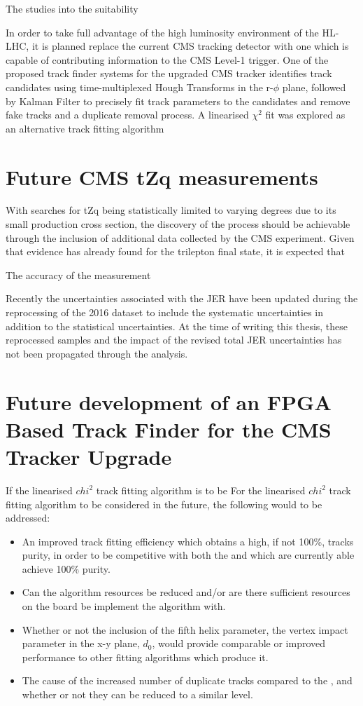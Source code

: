 The studies into the suitability 

In order to take full advantage of the high luminosity environment of the HL-LHC, it is planned replace the current CMS tracking detector with one which is capable of contributing information to the CMS Level-1 trigger.
One of the proposed track finder systems for the upgraded CMS tracker identifies track candidates using time-multiplexed Hough Transforms in the r-$\phi$ plane, followed by Kalman Filter to precisely fit track parameters to the candidates and remove fake tracks and a duplicate removal process.
A linearised $\chi^{2}$ fit was explored as an alternative track fitting algorithm

\section{Future CMS tZq measurements}
With searches for tZq being statistically limited to varying degrees due to its small production cross section, the discovery of the process should be achievable through the inclusion of additional data collected by the CMS experiment.
Given that evidence has already found for the trilepton final state, it is expected that 

The accuracy of the measurement

Recently the uncertainties associated with the JER have been updated during the reprocessing of the 2016 dataset to include the systematic uncertainties in addition to the statistical uncertainties.
At the time of writing this thesis, these reprocessed samples and the impact of the revised total JER uncertainties has not been propagated through the analysis.

\section{Future development of an FPGA Based Track Finder for the CMS Tracker Upgrade}
If the linearised $chi^{2}$ track fitting algorithm is to be 
For the linearised $chi^{2}$ track fitting algorithm to be considered in the future, the following would to be addressed:
\begin{itemize}
\item An improved track fitting efficiency which obtains a high, if not 100\%, tracks purity, in order to be competitive with both the \KF and \LR which are currently able achieve 100\% purity.
\item Can the algorithm resources be reduced and/or are there sufficient resources on the board be implement the algorithm with.
\item Whether or not the inclusion of the fifth helix parameter, the vertex impact parameter in the x-y plane, $d_{0}$, would provide comparable or improved performance to other fitting algorithms which produce it.
\item The cause of the increased number of duplicate tracks compared to the \KF, and whether or not they can be reduced to a similar level.
\end{itemize}

